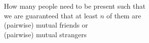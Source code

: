 \documentclass[preview]{standalone}
\begin{document}
\begin{center}
How many people need to be present such that \\ we are guaranteed that at least $n$ of them are \\ (pairwise) mutual friends or \\ (pairwise) mutual strangers
\end{center}
\end{document}
